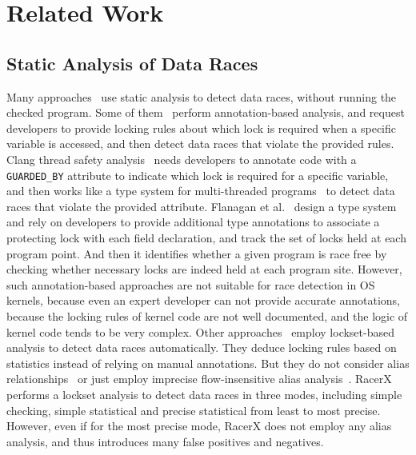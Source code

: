\section{Related Work}
\label{sec_related}

\subsection{Static Analysis of Data Races}
\label{subsec_static}
Many approaches~\cite{Boyapati:OOPSLA02, Anderson:PLDI08, Anderson:PLDI09, 
Zhou:MICRO19, Flanagan:PASTE01, Flanagan:PLDI00, Sadowski:PLATEAU14, 
ClangThreadSafety, Blackshear:OOPSLA18, Choi:PLDI02, Engler:SOSP03, 
Voung:FSE07, Pratikakis:PLDI06, Naik:PLDI06} use static analysis to detect data 
races, without running the checked program. Some of 
them~\cite{Boyapati:OOPSLA02, Anderson:PLDI08, Anderson:PLDI09, Zhou:MICRO19, 
Flanagan:PASTE01, Flanagan:PLDI00, Sadowski:PLATEAU14, ClangThreadSafety} 
perform annotation-based analysis, and request developers to provide locking 
rules about which lock is required when a specific variable is accessed, and 
then detect data races that violate the provided rules. Clang thread safety 
analysis~\cite{ClangThreadSafety} needs developers to annotate code with a {\tt 
GUARDED\_BY} attribute to indicate which lock is required for a specific 
variable, and then works like a type system for multi-threaded 
programs~\cite{Vu:SoICT12, Boyapati:OOPSLA02, Marion:TAMC14} to detect data 
races that violate the provided attribute. Flanagan et 
al.~\cite{Flanagan:PLDI00} design a type system and rely on developers to 
provide additional type annotations to associate a protecting lock with each 
field declaration, and track the set of locks held at each program point. And 
then it identifies whether a given program is race free by checking whether 
necessary locks are indeed held at each program site. However, such 
annotation-based approaches are not suitable for race detection in OS kernels, 
because even an expert developer can not provide accurate annotations, because 
the locking rules of kernel code are not well documented, and the logic of 
kernel code tends to be very complex. Other 
approaches~\cite{Blackshear:OOPSLA18, Choi:PLDI02, Engler:SOSP03, Voung:FSE07, 
Pratikakis:PLDI06, Naik:PLDI06} employ lockset-based analysis to detect data 
races automatically. They deduce locking rules based on statistics instead of 
relying on manual annotations. But they do not consider alias 
relationships~\cite{Voung:FSE07, Engler:SOSP03} or just employ imprecise 
flow-insensitive alias analysis~\cite{Choi:PLDI02, 	Pratikakis:PLDI06, 
Naik:PLDI06}. RacerX~\cite{Engler:SOSP03} performs a lockset analysis to detect 
data races in three modes, including simple checking, simple statistical and 
precise statistical from least to most precise. However, even if for the most 
precise mode, RacerX does not employ any alias analysis, and thus introduces 
many false positives and negatives.

